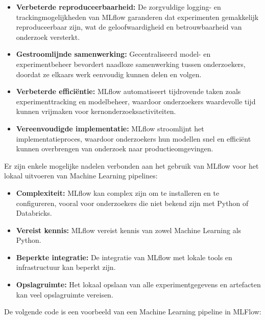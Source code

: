 \begin{itemize}
    \item \textbf{Verbeterde reproduceerbaarheid:} De zorgvuldige logging- en trackingmogelijkheden van MLflow garanderen dat experimenten gemakkelijk reproduceerbaar zijn, wat de geloofwaardigheid en betrouwbaarheid van onderzoek versterkt.
    \item \textbf{Gestroomlijnde samenwerking:} Gecentraliseerd model- en experimentbeheer bevordert naadloze samenwerking tussen onderzoekers, doordat ze elkaars werk eenvoudig kunnen delen en volgen.
    \item \textbf{Verbeterde efficiëntie:} MLflow automatiseert tijdrovende taken zoals experimenttracking en modelbeheer, waardoor onderzoekers waardevolle tijd kunnen vrijmaken voor kernonderzoeksactiviteiten.
    \item \textbf{Vereenvoudigde implementatie:} MLflow stroomlijnt het implementatieproces, waardoor onderzoekers hun modellen snel en efficiënt kunnen overbrengen van onderzoek naar productieomgevingen.
\end{itemize}

Er zijn enkele mogelijke nadelen verbonden aan het gebruik van MLflow voor het lokaal uitvoeren van Machine Learning pipelines:

\begin{itemize}
    \item \textbf{Complexiteit:} MLflow kan complex zijn om te installeren en te configureren, vooral voor onderzoekers die niet bekend zijn met Python of Databricks.
    \item \textbf{Vereist kennis:} MLflow vereist kennis van zowel Machine Learning als Python.
    \item \textbf{Beperkte integratie:} De integratie van MLflow met lokale tools en infrastructuur kan beperkt zijn.
    \item \textbf{Opslagruimte:} Het lokaal opslaan van alle experimentgegevens en artefacten kan veel opslagruimte vereisen.
\end{itemize}

De volgende code is een voorbeeld van een Machine Learning pipeline in MLFlow:


